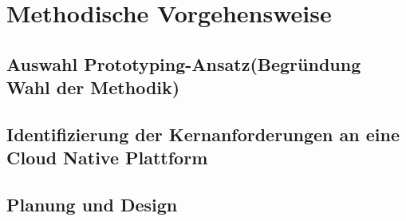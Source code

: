 \newpage
\section{Methodische Vorgehensweise}
\subsection{Auswahl Prototyping-Ansatz(Begründung Wahl der Methodik)}
\subsection{Identifizierung der Kernanforderungen an eine Cloud Native Plattform}
\subsection{Planung und Design}